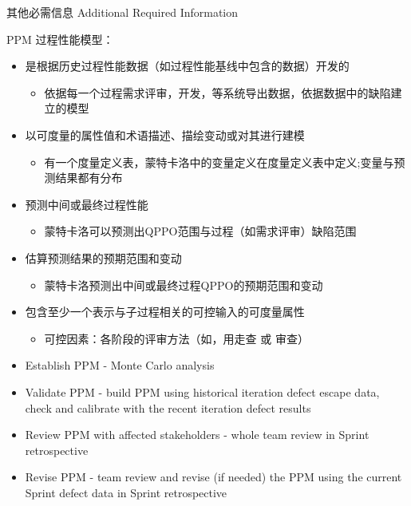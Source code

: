 其他必需信息 Additional Required Information

\begin{description}
\tightlist
\item[]
PPM 过程性能模型：
\end{description}

\begin{itemize}
\tightlist
\item
  是根据历史过程性能数据（如过程性能基线中包含的数据）开发的

  \begin{itemize}
  \tightlist
  \item
    依据每一个过程需求评审，开发，等系统导出数据，依据数据中的缺陷建立的模型
  \end{itemize}
\item
  以可度量的属性值和术语描述、描绘变动或对其进行建模

  \begin{itemize}
  \tightlist
  \item
    有一个度量定义表，蒙特卡洛中的变量定义在度量定义表中定义;变量与预测结果都有分布
  \end{itemize}
\item
  预测中间或最终过程性能

  \begin{itemize}
  \tightlist
  \item
    蒙特卡洛可以预测出QPPO范围与过程（如需求评审）缺陷范围
  \end{itemize}
\item
  估算预测结果的预期范围和变动

  \begin{itemize}
  \tightlist
  \item
    蒙特卡洛预测出中间或最终过程QPPO的预期范围和变动
  \end{itemize}
\item
  包含至少一个表示与子过程相关的可控输入的可度量属性

  \begin{itemize}
  \tightlist
  \item
    可控因素：各阶段的评审方法（如，用走查 或 审查）
  \end{itemize}
\end{itemize}

\begin{itemize}
\tightlist
\item
  Establish PPM - Monte Carlo analysis
\item
  Validate PPM - build PPM using historical iteration defect escape
  data, check and calibrate with the recent iteration defect results
\item
  Review PPM with affected stakeholders - whole team review in Sprint
  retrospective
\item
  Revise PPM - team review and revise (if needed) the PPM using the
  current Sprint defect data in Sprint retrospective
\end{itemize}

